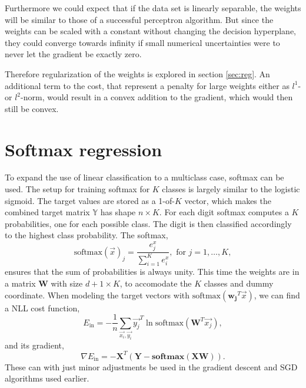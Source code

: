 \documentclass[a4paper,10pt,article,oneside,english]{memoir}
\begin{document}
Furthermore we could expect that if the data set is linearly separable, the weights will be similar to those of a successful perceptron algorithm. But since the weights can be scaled with a constant without changing the decision hyperplane, they could converge towards infinity if small numerical uncertainties were to never let the gradient be exactly zero. 

Therefore regularization of the weights is explored in section \ref{sec:reg}. An additional term to the cost, that represent a penalty for large weights either as $l^1$- or $l^2$-norm, would result in a convex addition to the gradient, which would then still be convex.




\section{Softmax regression}\label{sec:softmax}
To expand the use of linear classification to a multiclass case, softmax can be used. The setup for training softmax for $K$ classes is largely similar to the logistic sigmoid. The target values are stored as a 1-of-$K$ vector, which makes the combined target matrix $\mathbb{Y}$ has shape $n \times K$. For each digit softmax computes a $K$ probabilities, one for each possible class. The digit is then classified accordingly to the highest class probability. The softmax,
\begin{equation}
\text{softmax}(\vec{x})_j = \frac{e^x_j}{\sum_{i=1}^K e^x_i}, \text{ for } j=1,\dots,K , 
\end{equation}
ensures that the sum of probabilities is always unity. This time the weights are in a matrix $\mathbf{W}$ with size $d+1 \times K$, to accomodate the $K$ classes and dummy coordinate. When modeling the target vectors with $\text{softmax}(\mathbf{w_j}^T \vec{x})$, we can find a NLL cost function,
\begin{equation}
E_\text{in} = - \frac{1}{n} \sum_{\vec{x_i}, \vec{y_i}} \vec{y_j}^T \ln\text{softmax}(\mathbf{W}^T \vec{x_j}),
\end{equation} and its gradient,
\begin{equation}
\nabla E_\text{in} = -\mathbf{X}^T \left(\mathbf{Y - softmax(\mathbf{X}\mathbf{W})}\right).
\end{equation} 
These can with just minor adjustments be used in the gradient descent and SGD algorithms used earlier.
\end{document}
